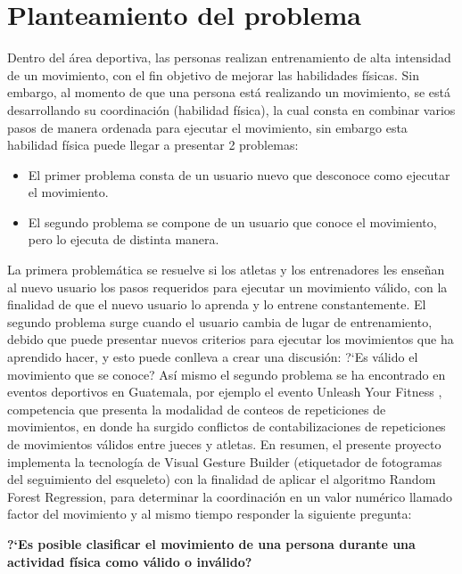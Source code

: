 \chapter{Planteamiento del problema}
Dentro del \'area deportiva, las personas realizan entrenamiento de alta intensidad de un movimiento, con el fin objetivo de mejorar las habilidades f\'isicas. Sin embargo, al momento de que una persona est\'a realizando un movimiento, se est\'a desarrollando su coordinaci\'on (habilidad f\'isica), la cual consta en combinar varios pasos de manera ordenada para ejecutar el movimiento, sin embargo esta habilidad f\'isica puede llegar a presentar 2 problemas:
\begin{itemize}
	\item El primer problema consta de un usuario nuevo que desconoce como ejecutar el movimiento.
	\item El segundo problema se compone de un usuario que conoce el movimiento, pero lo ejecuta de distinta manera.
\end{itemize} 
La primera problem\'atica se resuelve si los atletas y los entrenadores les ense\~nan al nuevo usuario los pasos requeridos para ejecutar un movimiento v\'alido, con la finalidad de que el nuevo usuario lo aprenda y lo entrene constantemente.
\medbreak
El segundo problema surge cuando el usuario cambia de lugar de entrenamiento, debido que puede presentar nuevos criterios para ejecutar los movimientos que ha aprendido hacer, y esto puede conlleva a crear una discusi\'on: ?`Es v\'alido el movimiento que se conoce?
\medbreak
\medbreak
As\'i mismo el segundo problema se ha encontrado en eventos deportivos en Guatemala, por ejemplo el evento Unleash Your Fitness \cite{unleash}, competencia que presenta la modalidad de conteos de repeticiones de movimientos, en donde ha surgido conflictos de contabilizaciones de repeticiones de  movimientos v\'alidos entre jueces y atletas.
\medbreak
\medbreak
En resumen, el presente proyecto implementa la tecnolog\'ia de Visual Gesture Builder (etiquetador de fotogramas del seguimiento del esqueleto) con la finalidad de aplicar el algoritmo Random Forest Regression, para determinar la coordinaci\'on en un valor num\'erico llamado factor del movimiento y al mismo tiempo responder la siguiente pregunta:
\medbreak
\medbreak
\begin{center}
\textbf{?`Es posible clasificar el movimiento de una persona durante una actividad f\'isica como v\'alido o inv\'alido?}
\end{center}





